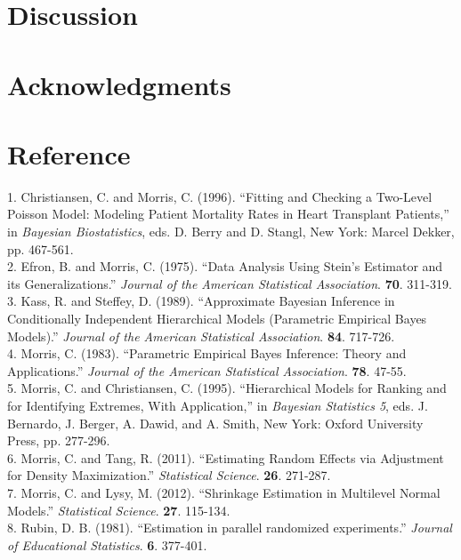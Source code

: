 \documentclass[article]{jss}
\begin{document}
\section[Discussion]{Discussion}

\section[acknowledgments]{Acknowledgments}

\section[Reference]{Reference}
1. Christiansen, C. and Morris, C. (1996). ``Fitting and Checking a Two-Level Poisson Model: Modeling Patient Mortality Rates in Heart Transplant Patients,'' in \emph{Bayesian Biostatistics}, eds. D. Berry and D. Stangl, New York: Marcel Dekker, pp. 467-561.
\\

2. Efron, B. and Morris, C. (1975). ``Data Analysis Using Stein's Estimator and its Generalizations.'' \emph{Journal of the American Statistical Association}. \textbf{70}. 311-319.
\\

3. Kass, R. and Steffey, D. (1989). ``Approximate Bayesian Inference in Conditionally Independent Hierarchical Models (Parametric
Empirical Bayes Models).'' \emph{Journal of the American Statistical Association}. \textbf{84}. 717-726.
\\

4. Morris, C. (1983). ``Parametric Empirical Bayes Inference: Theory and Applications.'' \emph{Journal of the American Statistical Association}. \textbf{78}. 47-55.
\\

5. Morris, C. and Christiansen, C. (1995). ``Hierarchical Models for Ranking and for Identifying Extremes, With Application,'' in \emph{Bayesian Statistics 5}, eds. J. Bernardo, J. Berger, A. Dawid, and A. Smith, New York: Oxford University Press, pp. 277-296.
\\

6. Morris, C. and Tang, R. (2011). ``Estimating Random Effects via Adjustment for Density Maximization.'' \emph{Statistical Science}. \textbf{26}. 271-287.
\\

7. Morris, C. and Lysy, M. (2012). ``Shrinkage Estimation in Multilevel Normal Models.'' \emph{Statistical Science}. \textbf{27}. 115-134.
\\

8. Rubin, D. B. (1981). ``Estimation in parallel randomized
  experiments.'' \emph{Journal of Educational Statistics}. \textbf{6}. 377-401.
\\
\end{document}
